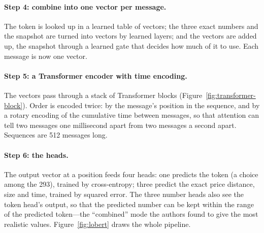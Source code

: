 \paragraph{Step 4: combine into one vector per message.} The token is looked up in a learned table of vectors; the
three exact numbers and the snapshot are turned into vectors by learned layers; and the vectors are added up, the
snapshot through a learned gate that decides how much of it to use. Each message is now one vector.

\paragraph{Step 5: a Transformer encoder with time encoding.} The vectors pass through a stack of Transformer blocks
(Figure~\ref{fig:transformer-block}). Order is encoded twice: by the message's position in the sequence, and by a
rotary encoding of the cumulative time between messages, so that attention can tell two messages one millisecond
apart from two messages a second apart. Sequences are 512 messages long.

\paragraph{Step 6: the heads.} The output vector at a position feeds four heads: one predicts the token (a choice among
the 293), trained by cross-entropy; three predict the exact price distance, size and time, trained by squared error.
The three number heads also see the token head's output, so that the predicted number can be kept within the range of
the predicted token---the ``combined'' mode the authors found to give the most realistic values.
Figure~\ref{fig:lobert} draws the whole pipeline.

